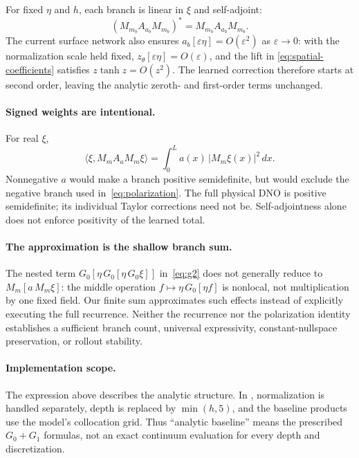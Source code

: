 \documentclass[11pt,letterpaper]{article}
\begin{document}
For fixed $\eta$ and $h$, each branch is linear in $\xi$ and self-adjoint:
\begin{equation}
  (M_{m_b}A_{a_b}M_{m_b})^*
   =M_{m_b}A_{a_b}M_{m_b}.
\end{equation}
The current surface network also ensures
$a_b[\varepsilon\eta]=O(\varepsilon^2)$ as $\varepsilon\to0$:
with the normalization scale held fixed,
$z_\theta[\varepsilon\eta]=O(\varepsilon)$, and the lift in
\eqref{eq:spatial-coefficients} satisfies $z\tanh z=O(z^2)$.
The learned correction therefore starts at second order,
leaving the analytic zeroth- and first-order terms unchanged.

\paragraph{Signed weights are intentional.}
For real $\xi$,
\begin{equation}
  \langle\xi,M_m A_a M_m\xi\rangle
    =\int_0^L a(x)\,|M_m\xi(x)|^2\,dx.
\end{equation}
Nonnegative $a$ would make a branch positive semidefinite, but would exclude
the negative branch used in~\eqref{eq:polarization}. The full physical DNO
is positive semidefinite; its individual Taylor corrections need not be.
Self-adjointness alone does not enforce positivity of the learned total.

\paragraph{The approximation is the shallow branch sum.}
The nested term $G_0[\eta\,G_0[\eta\,G_0\xi]]$ in~\eqref{eq:g2}
does not generally reduce to $M_m[a\,M_m\xi]$: the middle operation
$f\mapsto\eta\,G_0[\eta f]$ is nonlocal, not multiplication by one fixed
field. Our finite sum approximates such effects instead of explicitly
executing the full recurrence. Neither the recurrence nor the polarization
identity establishes a sufficient branch count, universal expressivity,
constant-nullspace preservation, or rollout stability.

\paragraph{Implementation scope.}
The expression above describes the analytic structure. In
, normalization is handled separately,
depth is replaced by $\min(h,5)$, and the baseline products use the model's
collocation grid. Thus ``analytic baseline'' means the prescribed $G_0+G_1$
formulas, not an exact continuum evaluation for every depth and discretization.
\end{document}
